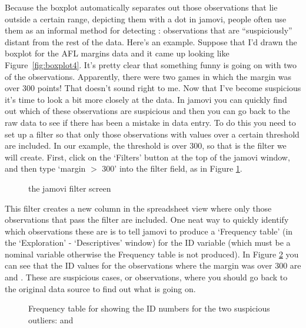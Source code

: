 Because the boxplot automatically separates out those observations that lie outside a certain range, depicting them with a dot in jamovi, people often use them as an informal method for detecting : observations that are ``suspiciously'' distant from the rest of the data. Here's an example. Suppose that I'd drawn the boxplot for the AFL margins data and it came up looking like Figure~\ref{fig:boxplot4}. It's pretty clear that something funny is going on with two of the observations. Apparently, there were two games in which the margin was over 300 points! That doesn't sound right to me. Now that I've become suspicious it's time to look a bit more closely at the data. In jamovi you can quickly find out which of these observations are suspicious and then you can go back to the raw data to see if there has been a mistake in data entry. To do this you need to set up a filter so that only those observations with values over a certain threshold are included. In our example, the threshold is over 300, so that is the filter we will create. First, click on the `Filters' button at the top of the jamovi window, and then type `margin $>$ 300' into the filter field, as in Figure \ref{fig:filter1}. 

\begin{figure}[htp]
\begin{center}
\caption{the jamovi filter screen}
\label{fig:filter1}
\HR
\end{center}
\end{figure}

This filter creates a new column in the spreadsheet view where only those observations that pass the filter are included. One neat way to quickly identify which observations these are is to tell jamovi to produce a `Frequency table' (in the `Exploration' - `Descriptives' window) for the ID variable (which must be a nominal variable otherwise the Frequency table is not produced). In Figure \ref{fig:filter2} you can see that the ID values for the observations where the margin was over 300 are  and . These are suspicious cases, or observations, where you should go back to the original data source to find out what is going on.

\begin{figure}[htp]
\begin{center}
\caption{Frequency table for  showing the ID numbers for the two suspicious outliers:  and }
\label{fig:filter2}
\HR
\end{center}
\end{figure}

